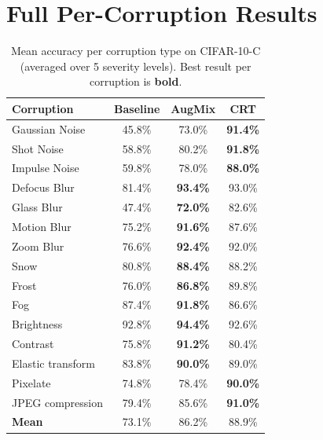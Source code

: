 \documentclass[10pt,twocolumn]{article}
\begin{document}
\clearpage
\section{Full Per-Corruption Results}
\label{app:full_results}

\begin{table}[h]
\centering
\small
\caption{Mean accuracy per corruption type on CIFAR-10-C (averaged over 5 severity levels). Best result per corruption is \textbf{bold}.}
\label{tab:full_corruption}
\begin{tabular}{lccc}
\toprule
\textbf{Corruption} & \textbf{Baseline} & \textbf{AugMix} & \textbf{CRT} \\
\midrule
Gaussian Noise  & 45.8\% & 73.0\% & \textbf{91.4\%} \\
Shot Noise      & 58.8\% & 80.2\% & \textbf{91.8\%} \\
Impulse Noise   & 59.8\% & 78.0\% & \textbf{88.0\%} \\
Defocus Blur    & 81.4\% & \textbf{93.4\%} & 93.0\% \\
Glass Blur      & 47.4\% & \textbf{72.0\%} & 82.6\% \\
Motion Blur     & 75.2\% & \textbf{91.6\%} & 87.6\% \\
Zoom Blur       & 76.6\% & \textbf{92.4\%} & 92.0\% \\
Snow            & 80.8\% & \textbf{88.4\%} & 88.2\% \\
Frost           & 76.0\% & \textbf{86.8\%} & 89.8\% \\
Fog             & 87.4\% & \textbf{91.8\%} & 86.6\% \\
Brightness      & 92.8\% & \textbf{94.4\%} & 92.6\% \\
Contrast        & 75.8\% & \textbf{91.2\%} & 80.4\% \\
Elastic transform        & 83.8\% & \textbf{90.0\%} & 89.0\% \\
Pixelate        & 74.8\% & 78.4\% & \textbf{90.0\%} \\
JPEG compression           & 79.4\% & 85.6\% & \textbf{91.0\%} \\
\midrule
\textbf{Mean}   & 73.1\% & 86.2\% & 88.9\% \\
\bottomrule
\end{tabular}
\end{table}
\end{document}
